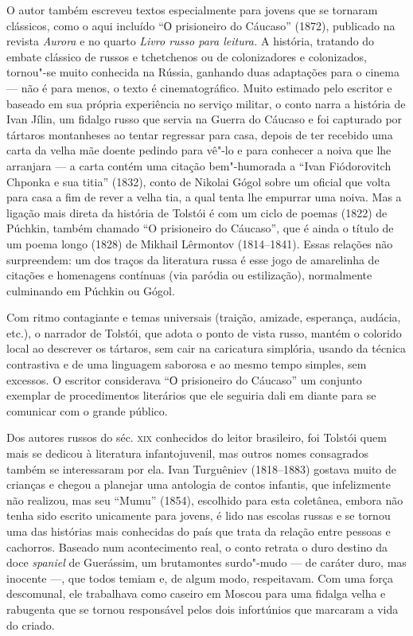 O autor também escreveu textos especialmente para jovens que se tornaram
clássicos, como o aqui incluído ``О prisioneiro do Cáucaso'' (1872),
publicado na revista \emph{Aurora} e no quarto \emph{Livro russo para
leitura.} A história, tratando do embate clássico de russos e
tchetchenos ou de colonizadores e colonizados, tornou"-se muito conhecida
na Rússia, ganhando duas adaptações para o cinema --- não é para menos, o
texto é cinematográfico. Muito estimado pelo escritor e baseado em
sua própria experiência no serviço militar, o conto narra a história de
Ivan Jílin, um fidalgo russo que servia na Guerra do Cáucaso e foi
capturado por tártaros montanheses ao tentar regressar para casa, depois
de ter recebido uma carta da velha mãe doente pedindo para vê"-lo e para
conhecer a noiva que lhe arranjara --- a carta contém uma citação
bem"-humorada a ``Ivan Fiódorovitch Chponka e sua titia''
(1832), conto de Nikolai Gógol sobre um oficial que volta para casa a fim de rever a velha tia, a qual tenta lhe
empurrar uma noiva. Mas a ligação mais direta da história de Tolstói é
com um ciclo de poemas (1822) de Púchkin, também chamado ``O prisioneiro
do Cáucaso'', que é ainda o título de um poema longo (1828) de
Mikhail Lêrmontov (1814--1841). Essas relações não surpreendem: um dos
traços da literatura russa é esse jogo de amarelinha de citações e
homenagens contínuas (via paródia ou estilização), normalmente
culminando em Púchkin ou Gógol.

Com ritmo contagiante e temas universais (traição, amizade, esperança,
audácia, etc.), o narrador de Tolstói, que adota o ponto de vista
russo, mantém o colorido local ao descrever os tártaros, sem cair na
caricatura simplória, usando da técnica contrastiva e de uma linguagem
saborosa e ao mesmo tempo simples, sem excessos. O escritor considerava ``О
prisioneiro do Cáucaso'' um conjunto exemplar de procedimentos
literários que ele seguiria dali em diante para se comunicar com o
grande público.

Dos autores russos do séc. \textsc{xix} conhecidos do leitor brasileiro, foi
Tolstói quem mais se dedicou à literatura infantojuvenil, mas outros
nomes consagrados também se interessaram por ela. Ivan Turguêniev (1818--1883) gostava muito de crianças e chegou a planejar uma antologia de
contos infantis, que infelizmente não realizou, mas seu ``Mumu''
(1854), escolhido para esta coletânea, embora não tenha sido
escrito unicamente para jovens, é lido nas escolas russas e se tornou
uma das histórias mais conhecidas do país que trata da relação entre
pessoas e cachorros. Baseado num acontecimento real, o conto retrata o duro
destino da doce \emph{spaniel} de Guerássim, um brutamontes
surdo"-mudo --- de caráter duro, mas inocente ---, que todos temiam e, de algum
modo, respeitavam. Com uma força descomunal, ele trabalhava como caseiro
em Moscou para uma fidalga velha e rabugenta que se tornou responsável
pelos dois infortúnios que marcaram a vida do criado.

